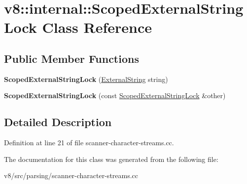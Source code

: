 \hypertarget{classv8_1_1internal_1_1ScopedExternalStringLock}{}\section{v8\+:\+:internal\+:\+:Scoped\+External\+String\+Lock Class Reference}
\label{classv8_1_1internal_1_1ScopedExternalStringLock}
\subsection*{Public Member Functions}
\begin{DoxyCompactItemize}
\item 
\mbox{\label{classv8_1_1internal_1_1ScopedExternalStringLock_adbd45bf47ac0598251269b4ed8329569}} 
{\bfseries Scoped\+External\+String\+Lock} (\mbox{\hyperlink{classv8_1_1internal_1_1ExternalString}{External\+String}} string)
\item 
\mbox{\label{classv8_1_1internal_1_1ScopedExternalStringLock_a72d16bb664c85b343baf184cc0c263f1}} 
{\bfseries Scoped\+External\+String\+Lock} (const \mbox{\hyperlink{classv8_1_1internal_1_1ScopedExternalStringLock}{Scoped\+External\+String\+Lock}} \&other)
\end{DoxyCompactItemize}


\subsection{Detailed Description}


Definition at line 21 of file scanner-\/character-\/streams.\+cc.



The documentation for this class was generated from the following file\+:\begin{DoxyCompactItemize}
\item 
v8/src/parsing/scanner-\/character-\/streams.\+cc\end{DoxyCompactItemize}
